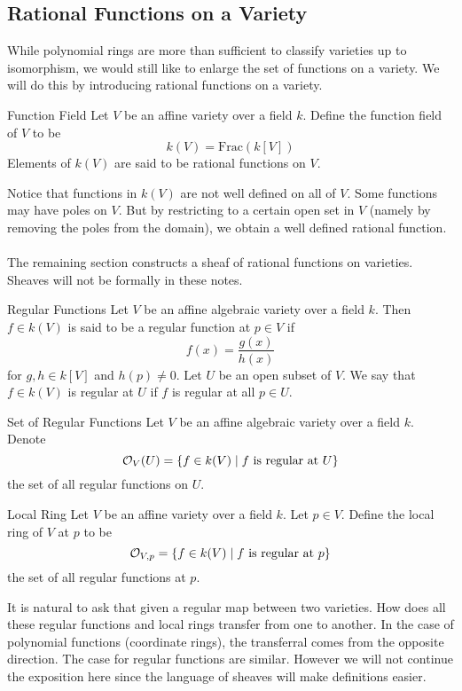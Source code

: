 \documentclass[a4paper]{article}
\begin{document}
\subsection{Rational Functions on a Variety}
While polynomial rings are more than sufficient to classify varieties up to isomorphism, we would still like to enlarge the set of functions on a variety. We will do this by introducing rational functions on a variety. 

\begin{defn}{Function Field}{} Let $V$ be an affine variety over a field $k$. Define the function field of $V$ to be $$k(V)=\text{Frac}(k[V])$$ Elements of $k(V)$ are said to be rational functions on $V$. 
\end{defn}

Notice that functions in $k(V)$ are not well defined on all of $V$. Some functions may have poles on $V$. But by restricting to a certain open set in $V$ (namely by removing the poles from the domain), we obtain a well defined rational function. \\~\\

The remaining section constructs a sheaf of rational functions on varieties. Sheaves will not be formally in these notes. 

\begin{defn}{Regular Functions}{} Let $V$ be an affine algebraic variety over a field $k$. Then $f\in k(V)$ is said to be a regular function at $p\in V$ if $$f(x)=\frac{g(x)}{h(x)}$$ for $g,h\in k[V]$ and $h(p)\neq 0$. Let $U$ be an open subset of $V$. We say that $f\in k(V)$ is regular at $U$ if $f$ is regular at all $p\in U$. 
\end{defn}

\begin{defn}{Set of Regular Functions}{} Let $V$ be an affine algebraic variety over a field $k$. Denote $$\mathcal{O}_V(U)=\{f\in k(V)\;|\;f\text{ is regular at }U\}$$ the set of all regular functions on $U$. 
\end{defn}

\begin{defn}{Local Ring}{} Let $V$ be an affine variety over a field $k$. Let $p\in V$. Define the local ring of $V$ at $p$ to be $$\mathcal{O}_{V,p}=\{f\in k(V)\;|\;f\text{ is regular at }p\}$$ the set of all regular functions at $p$. 
\end{defn}

It is natural to ask that given a regular map between two varieties. How does all these regular functions and local rings transfer from one to another. In the case of polynomial functions (coordinate rings), the transferral comes from the opposite direction. The case for regular functions are similar. However we will not continue the exposition here since the language of sheaves will make definitions easier. 
\end{document}
